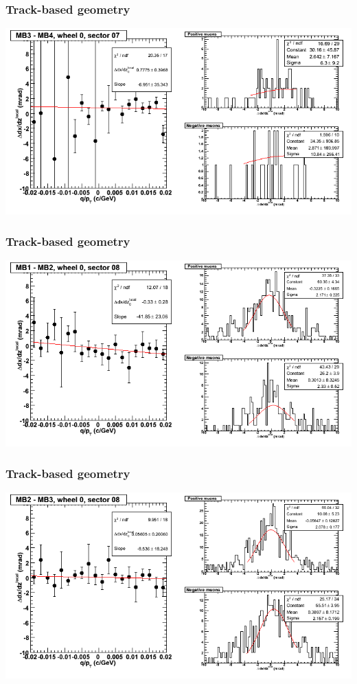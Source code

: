 \documentclass[compress]{beamer}
\begin{document}
\begin{frame}
\frametitle{Track-based geometry}
\includegraphics[width=\linewidth]{NOV4_segdiffs/dt13_slope_C_07_34.png}
\end{frame}

\begin{frame}
\frametitle{Track-based geometry}
\includegraphics[width=\linewidth]{NOV4_segdiffs/dt13_slope_C_08_12.png}
\end{frame}

\begin{frame}
\frametitle{Track-based geometry}
\includegraphics[width=\linewidth]{NOV4_segdiffs/dt13_slope_C_08_23.png}
\end{frame}
\end{document}
